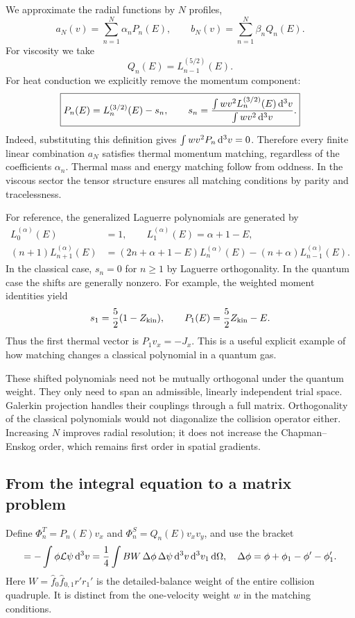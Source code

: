 We approximate the radial functions by $N$ profiles,
\begin{equation}
 a_N(v)=\sum_{n=1}^N\alpha_nP_n(E),\qquad
 b_N(v)=\sum_{n=1}^N\beta_nQ_n(E).
 \label{qt:expansion}
\end{equation}
For viscosity we take
\begin{equation}
 Q_n(E)=L_{n-1}^{(5/2)}(E).
\end{equation}
For heat conduction we explicitly remove the momentum component:
\begin{equation}
 \boxed{P_n(E)=L_n^{(3/2)}(E)-s_n,\qquad
 s_n=\frac{\int wv^2L_n^{(3/2)}(E)\,\mathrm d^3v}
                 {\int wv^2\,\mathrm d^3v}.}
 \label{qt:shift}
\end{equation}
Indeed, substituting this definition gives $\int wv^2P_n\,\mathrm d^3v=0$.
Therefore every finite linear combination $a_N$ satisfies thermal momentum
matching, regardless of the coefficients $\alpha_n$. Thermal mass and energy
matching follow from oddness. In the viscous sector the tensor structure
ensures all matching conditions by parity and tracelessness.

For reference, the generalized Laguerre polynomials are generated by
\begin{align}
 L_0^{(\alpha)}(E)&=1,\qquad L_1^{(\alpha)}(E)=\alpha+1-E,\\
 (n+1)L_{n+1}^{(\alpha)}(E)
 &=(2n+\alpha+1-E)L_n^{(\alpha)}(E)
 -(n+\alpha)L_{n-1}^{(\alpha)}(E).
\end{align}
In the classical case, $s_n=0$ for $n\geq1$ by Laguerre orthogonality.
In the quantum case the shifts are generally nonzero. For example,
the weighted moment identities yield
\begin{equation}
 s_1=\frac52(1-Z_{\mathrm{kin}}),\qquad
 P_1(E)=\frac52Z_{\mathrm{kin}}-E.
 \label{qt:firstprofile}
\end{equation}
Thus the first thermal vector is $P_1v_x=-J_x$. This is a useful explicit
example of how matching changes a classical polynomial in a quantum gas.

These shifted polynomials need not be mutually orthogonal under the quantum
weight. They only need to span an admissible, linearly independent trial space.
Galerkin projection handles their couplings through a full matrix. Orthogonality
of the classical polynomials would not diagonalize the collision operator
either. Increasing $N$ improves radial resolution; it does not increase the
Chapman--Enskog order, which remains first order in spatial gradients.

\subsection{From the integral equation to a matrix problem}
Define $\Phi_n^T=P_n(E)v_x$ and $\Phi_n^S=Q_n(E)v_xv_y$, and use the bracket
\begin{equation}
 [\phi,\psi]=-\int\phi\qtL\psi\qtd^3v
 =\frac14\int BW\,\Delta\phi\,\Delta\psi
          \qtd^3v\qtd^3v_1\qtd\Omega,
 \quad \Delta\phi=\phi+\phi_1-\phi'-\phi_1'.
 \label{qt:bracket}
\end{equation}
Here $W=\widehat f_0\widehat f_{0,1}r'r_1'$ is the detailed-balance weight
of the entire collision quadruple. It is distinct from the one-velocity
weight $w$ in the matching conditions.

